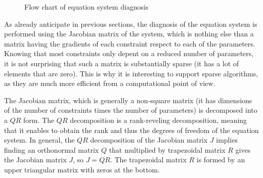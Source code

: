 \documentclass[12pt,twoside,a4paper]{book}
\begin{document}
    \begin{figure}
    \caption{Flow chart of equation system diagnosis}
    \end{figure}


    As already anticipate in previous sections, the diagnosis of the equation system is performed using the Jacobian matrix of the system, which is nothing else than a matrix having the gradients of each constraint respect to each of the parameters. Knowing that most constraints only depent on a reduced number of parameters, it is not surprising that such a matrix is substantially sparse (it has a lot of elements that are zero). This is why it is interesting to support sparse algorithms, as they are much more efficient from a computational point of view.

    The Jacobian matrix, which is generally a non-square matrix (it has dimensions of the number of constraints times the number of parameters) is decomposed into a $QR$ form. The $QR$ decomposition is a rank-reveling decomposition, meaning that it enables to obtain the rank and thus the degrees of freedom of the equation system. In general, the $QR$ decomposition of the Jacobian matrix $J$ implies finding an orthonormal matrix $Q$ that multiplied by trapezoidal matrix $R$ gives the Jacobian matrix $J$, so $J=QR$. The trapezoidal matrix $R$ is formed by an upper triangular matrix with zeros at the bottom.
\end{document}
